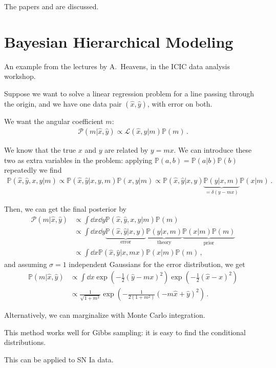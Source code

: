 \documentclass[main.tex]{subfiles}
\begin{document}

The papers \textcite[]{verdeFirstYearWilkinson2003} and \textcite[]{spergelFirstYearWilkinson2003} are discussed. 

\section{Bayesian Hierarchical Modeling}

An example from the lectures by A.\ Heavens, in the ICIC data analysis workshop. 

Suppose we want to solve a linear regression problem for a line passing through the origin, and we have one data pair \((\hat{x}, \hat{y})\), with error on both. 

We want the angular coefficient \(m\):
%
\begin{align}
\mathcal{P} (m | \hat{x}, \hat{y}) \propto \mathcal{L} (\hat{x}, \hat{y} | m) \mathbb{P}(m)
\,.
\end{align}

We know that the true \(x\) and \(y\) are related by \(y = mx\).
We can introduce these two as extra variables in the problem: applying \(\mathbb{P}(a, b) = \mathbb{P}(a | b) \mathbb{P}(b)\) repeatedly we find
%
\begin{align}
\mathbb{P}(\hat{x}, \hat{y}, x, y | m) \propto \mathbb{P}(\hat{x}, \hat{y} | x, y, m) \mathbb{P}(x, y | m) \propto \mathbb{P}(\hat{x}, \hat{y} | x, y) \underbrace{\mathbb{P}(y | x, m)}_{ = \delta (y - mx)} \mathbb{P}(x | m)
\,.
\end{align}

Then, we can get the final posterior by 
%
\begin{align}
\mathcal{P} (m | \hat{x}, \hat{y}) &\propto \int \dd{x} \dd{y} \mathbb{P}(\hat{x}, \hat{y}, x, y | m) \mathbb{P}(m)  \\
&\propto \int \dd{x} \dd{y} \underbrace{\mathbb{P}(\hat{x}, \hat{y} | x, y)}_{\text{error}} \underbrace{\mathbb{P}(y | x, m)}_{\text{theory}} \underbrace{\mathbb{P}(x | m) \mathbb{P}(m)}_{\text{prior}} \\
&\propto \int \dd{x} \mathbb{P}(\hat{x}, \hat{y} | x, mx)  \mathbb{P}(x | m) \mathbb{P}(m)
\,,
\end{align}
%
and assuming \(\sigma = 1\) independent Gaussians for the error distribution, we get 
%
\begin{align}
\mathbb{P}(m | \hat{x}, \hat{y}) &\propto 
\int \dd{x} \exp(- \frac{1}{2} (\hat{y} - mx)^2) \exp( - \frac{1}{2} (\hat{x} - x)^2)  \\
&\propto \frac{1}{\sqrt{1 + m^2}} \exp( - \frac{1}{2 (1+m^2)} (- m \hat{x} + \hat{y})^2 )
\,.
\end{align}

Alternatively, we can marginalize with Monte Carlo integration.

This method works well for Gibbs sampling: it is easy to find the conditional distributions.

This can be applied to SN Ia data. 
\end{document}
